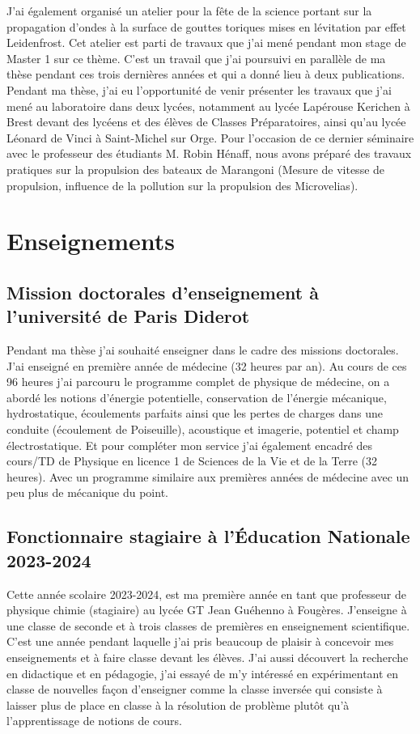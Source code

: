 \documentclass[french, 10pt]{article}
\begin{document}
J'ai également organisé un atelier pour la fête de la science portant sur la propagation d'ondes à la surface de gouttes toriques mises en lévitation par effet Leidenfrost. Cet atelier est parti de travaux que j'ai mené pendant mon stage de Master 1 sur ce thème. C'est un travail que j'ai poursuivi en parallèle de ma thèse pendant ces trois dernières années et qui a donné lieu à deux publications. Pendant ma thèse, j'ai eu l'opportunité de venir présenter les travaux que j'ai mené au laboratoire dans deux lycées, notamment au lycée Lapérouse Kerichen à Brest devant des lycéens et des élèves de Classes Préparatoires, ainsi qu'au lycée Léonard de Vinci à Saint-Michel sur Orge. Pour l'occasion de ce dernier séminaire avec le professeur des étudiants M. Robin Hénaff, nous avons préparé des travaux pratiques sur la propulsion des bateaux de Marangoni (Mesure de vitesse de propulsion, influence de la pollution sur la propulsion des Microvelias).


\section{Enseignements}


\subsection{Mission doctorales d'enseignement à l'université de Paris Diderot}

Pendant ma thèse j'ai souhaité enseigner dans le cadre des missions doctorales. J'ai enseigné en première année de médecine (32 heures par an). Au cours de ces 96 heures j'ai parcouru le programme complet de physique de médecine, on a abordé les notions d'énergie potentielle, conservation de l'énergie mécanique, hydrostatique, écoulements parfaits ainsi que les pertes de charges dans une conduite (écoulement de Poiseuille), acoustique et imagerie, potentiel et champ électrostatique. Et pour compléter mon service j'ai également encadré des cours/TD de Physique en licence 1 de Sciences de la Vie et de la Terre (32 heures). Avec un programme similaire aux premières années de médecine avec un peu plus de mécanique du point.

\subsection{Fonctionnaire stagiaire à l'Éducation Nationale 2023-2024}

Cette année scolaire 2023-2024, est ma première année en tant que professeur de physique chimie (stagiaire) au lycée GT Jean Guéhenno à Fougères. J'enseigne à une classe de seconde et à trois classes de premières en enseignement scientifique.  C'est une année pendant laquelle j'ai pris beaucoup de plaisir à concevoir mes enseignements et à faire classe devant les élèves. J'ai aussi découvert la recherche en didactique et en pédagogie, j'ai essayé de m'y intéressé en expérimentant en classe de nouvelles façon d'enseigner comme la classe inversée qui consiste à laisser plus de place en classe à la résolution de problème plutôt qu'à l'apprentissage de notions de cours. \medskip
\end{document}
